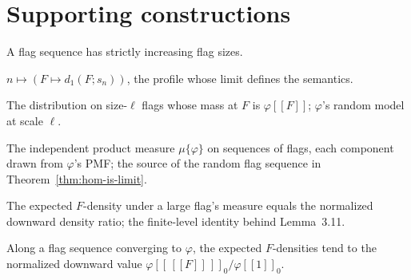 \section{Supporting constructions}

\begin{definition}
  \label{def:increases}
  \leanok
  A flag sequence has strictly increasing flag sizes.
\end{definition}

\begin{definition}
  \label{def:flag-density-seq}
  \leanok
  $n \mapsto (F \mapsto d_1(F; s_n))$, the profile whose limit defines the
  semantics.
\end{definition}

\begin{definition}
  \label{def:positivehom-topmf}
  \leanok
  The distribution on size-$\ell$ flags whose mass at $F$ is $\varphi[\![F]\!]$;
  $\varphi$'s random model at scale $\ell$.
\end{definition}

\begin{definition}
  \label{def:flagseq-measure}
  \leanok
  The independent product measure $\mu\{\varphi\}$ on sequences of flags, each
  component drawn from $\varphi$'s PMF; the source of the random flag sequence in
  Theorem~\ref{thm:hom-is-limit}.
\end{definition}

\begin{lemma}
  \label{lem:integral-density-div}
  \leanok
  The expected $F$-density under a large flag's measure equals the normalized
  downward density ratio; the finite-level identity behind Lemma~3.11.
\end{lemma}

\begin{theorem}
  \label{thm:lemma-3-11}
  \leanok
  Along a flag sequence converging to $\varphi$, the expected $F$-densities tend
  to the normalized downward value
  $\varphi[\![\,[\![F]\!]\,]\!]_0 / \varphi[\![1]\!]_0$.
\end{theorem}

